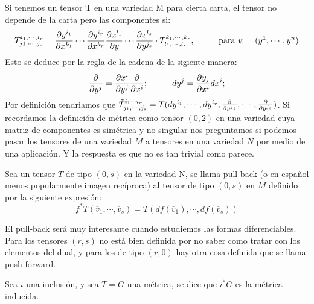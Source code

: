 \documentclass[palatino, bibnumbers]{apuntes}
\begin{document}
Si tenemos un tensor T en una variedad M para cierta carta, el tensor no depende de la carta pero las componentes si: $$\tilde{T}^{i_1,\cdots,i_r}_{j1,\cdots,j_s}=\pdv{y^{i_1}}{x^{k_1}}\cdots\pdv{y^{i_r}}{x^{k_r}}\pdv{x^{l_1}}{y}\cdots\pdv{x^{l_s}}{y^{j_s}}\cdot T^{k_1,\cdots,k_r}_{l_1,\cdots,l_s},\hspace*{1cm}\text{para }\psi=(y^1,\cdots,y^n)$$
Esto se deduce por la regla de la cadena de la sigiente manera: $$\pdv{y^j}=\pdv{x^i}{y^j}\pdv{x^i};\hspace*{1cm} dy^j=\pdv{y_j}{x^i}dx^i;$$
Por definición tendriamos que $\tilde{T}^{i_1\cdots i_r}_{j_1,\cdots,j_s}=T(dy^{i_1},\cdots,dy^{i_r},\pdv{y^{j_1}},\cdots,\pdv{y^{j_s}})$.
Si recordamos la definición de métrica como tensor $(0,2)$ en una variedad cuya matriz de componentes es simétrica y no singular nos preguntamos si podemos pasar los tensores de una variedad $M$ a tensores en una variedad $N$ por medio de una aplicación. Y la respuesta es que no es tan trivial como parece. 

\begin{defn} Sea un tensor $T$ de tipo $(0,s)$ en la variedad N, se llama pull-back (o en español menos popularmente imagen recíproca) al tensor de tipo $(0,s)$ en $M$ definido por la siguiente expresión: $$f^*T(\overline{v}_1,\cdots,\overline{v}_s)=T(df(\overline{v}_1),\cdots,df(\overline{v}_s))$$
\end{defn}

El pull-back será muy interesante cuando estudiemos las formas diferenciables. Para los tensores $(r,s)$ no está bien definida por no saber como tratar con los elementos del dual, y para los de tipo $(r,0)$ hay otra cosa definida que se llama push-forward.
\newpage
\begin{defn} Sea $i$ una inclusión, y sea $T=G$ una métrica, se dice que $i^*G$ es la métrica inducida.
\end{defn}
\end{document}

